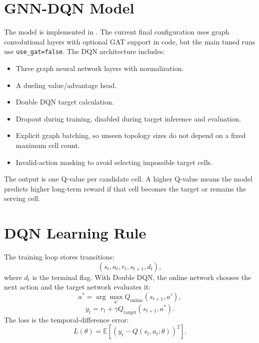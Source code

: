 \documentclass[12pt,a4paper]{report}
\begin{document}
\section{GNN-DQN Model}
The model is implemented in . The current final configuration uses graph convolutional layers with optional GAT support in code, but the main tuned runs use \texttt{use\_gat=false}. The DQN architecture includes:

\begin{itemize}
    \item Three graph neural network layers with normalization.
    \item A dueling value/advantage head.
    \item Double DQN target calculation.
    \item Dropout during training, disabled during target inference and evaluation.
    \item Explicit graph batching, so unseen topology sizes do not depend on a fixed maximum cell count.
    \item Invalid-action masking to avoid selecting impossible target cells.
\end{itemize}

The output is one Q-value per candidate cell. A higher Q-value means the model predicts higher long-term reward if that cell becomes the target or remains the serving cell.

\section{DQN Learning Rule}
The training loop stores transitions:
\begin{equation}
    (s_t, a_t, r_t, s_{t+1}, d_t),
\end{equation}
where $d_t$ is the terminal flag. With Double DQN, the online network chooses the next action and the target network evaluates it:
\begin{equation}
    a^* = \arg\max_{a'} Q_{\text{online}}(s_{t+1}, a'),
\end{equation}
\begin{equation}
    y_t = r_t + \gamma Q_{\text{target}}(s_{t+1}, a^*).
\end{equation}
The loss is the temporal-difference error:
\begin{equation}
    L(\theta) = \mathbb{E}\left[(y_t - Q(s_t,a_t;\theta))^2\right].
\end{equation}
\end{document}
